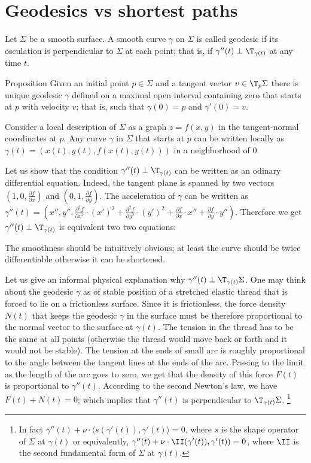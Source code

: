 \chapter{Geodesics vs shortest paths}

Let $\Sigma$ be a smooth surface.
A smooth curve $\gamma$ on $\Sigma$ is called geodesic if its osculation is perpendicular to $\Sigma$ at each point;
that is, if $\gamma''(t)\perp\T_{\gamma(t)}$ at any time $t$.

\begin{thm}{Proposition}
Given an initial point $p\in \Sigma$ and a tangent vector $v\in\T_p\Sigma$ there is unique geodesic $\gamma$ defined on a maximal open interval containing zero that starts at $p$ with velocity $v$; that is,
such that $\gamma(0)=p$ and $\gamma'(0)=v$.
\end{thm}

Consider a local description of $\Sigma$ as a graph $z=f(x,y)$ in the tangent-normal coordinates at $p$.
Any curve $\gamma$ in $\Sigma$ that starts at $p$ can be written locally as 
$\gamma(t)=(x(t),y(t),f(x(t),y(t)))$ in a neighborhood of $0$.

Let us show that the condition $\gamma''(t)\perp\T_{\gamma(t)}$ can be written as an odinary differential equation.
Indeed, the tangent plane is spanned by two vectors $(1,0,\tfrac{\partial f}{\partial x})$ and $(0,1,\tfrac{\partial f}{\partial y})$.
The acceleration of $\gamma$ can be written as $\gamma''(t)=(x'',y'',\tfrac{\partial^2 f}{\partial x^2}\cdot (x')^2+\tfrac{\partial^2 f}{\partial y^2}\cdot (y')^2+\tfrac{\partial f}{\partial x}\cdot x''+\tfrac{\partial f}{\partial y}\cdot y'')$.
Therefore we get $\gamma''(t)\perp\T_{\gamma(t)}$ is equivalent two two equations:




The smoothness should be intuitively obvious; at least the curve should be twice differentiable otherwise it can be shortened.

Let us give an informal physical explanation why $\gamma''(t)\perp\T_{\gamma(t)}\Sigma$.
One may think about the geodesic $\gamma$ as of stable position of a stretched elastic thread that is forced to lie on a frictionless surface.
Since it is frictionless, the force density $N(t)$ that keeps the geodesic $\gamma$ in the surface must be therefore proportional to the normal vector to the surface at $\gamma(t)$.
The tension in the thread has to be the same at all points (otherwise the thread would move back or forth and it would not be stable).
The tension at the ends of small arc is roughly proportional to the angle between the tangent lines at the ends of the arc. 
Passing to the limit as the length of the arc goes to zero, we get that the density of this force $F(t)$ is proportional to $\gamma''(t)$.
According to the second Newton's law, we have $F(t)+N(t)=0$;
which implies that  $\gamma''(t)$ is perpendicular to $\T_{\gamma(t)}\Sigma$.%
\footnote{In fact $\gamma''(t)+\nu\cdot \langle s(\gamma'(t)),\gamma'(t)\rangle=0$, where $s$ is the shape operator of $\Sigma$ at $\gamma(t)$ or equivalently,
$\gamma''(t)+\nu\cdot  \II(\gamma'(t)),\gamma'(t))=0$, where $\II$ is the second fundamental form of $\Sigma$ at $\gamma(t)$.}

